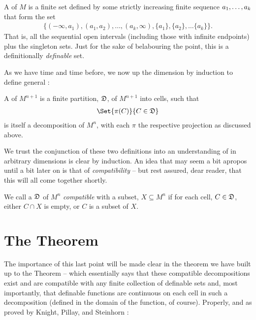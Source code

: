 \begin{definition}
  A \emph{\cd} of $M$ is a finite set defined by some strictly increasing finite sequence $a_1, \hdots, a_k$ that form the set
  \begin{align*}
    \{(- \infty, a_1), (a_1, a_2), \hdots, (a_k, \infty), \{a_1\}, \{a_2\}, \hdots \{a_k\} \}.
  \end{align*}
  That is, all the sequential open intervals (including those with infinite endpoints) plus the singleton sets. Just for the sake of belabouring the point, this is a definitionally \emph{definable} set.
\end{definition}

As we have time and time before, we now up the dimension by induction to define general \cds:

\begin{definition}
  A \cd of $M^{n+1}$ is a finite partition, $\mathfrak{D}$, of $M^{n+1}$ into cells, such that
  \begin{align*}
    \Set{\pi (C)}{C \in \fancyD}
  \end{align*}
  is itself a decomposition of $M^n$, with each $\pi$ the respective projection as discussed above.
\end{definition}


We trust the conjunction of these two definitions into an understanding of \cds in arbitrary dimensions is clear by induction.
An idea that may seem a bit apropos until a bit later on is that of \emph{compatibility} -- but rest assured, dear reader, that this will all come together shortly.

\begin{definition}[Compatibility]
  We call a \cd $\mathfrak{D}$ of $M^n$ \emph{compatible} with a subset, $X \subseteq M^n$ if for each cell, $C \in \mathfrak{D}$, either $C \cap X$ is empty, or $C$ is a subset of $X$.
\end{definition}


\section{The \CD Theorem}

The importance of this last point will be made clear in the theorem we have built up to the \CD Theorem -- which essentially says that these compatible decompositions exist and are compatible with any finite collection of definable sets and, most importantly, that definable functions are continuous on each cell in such a decomposition (defined in the domain of the function, of course). Properly, and as proved by Knight, Pillay, and Steinhorn \cite{knight_definable_1986}:

